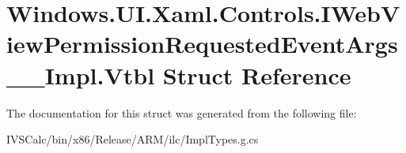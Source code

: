 \hypertarget{struct_windows_1_1_u_i_1_1_xaml_1_1_controls_1_1_i_web_view_permission_requested_event_args_____impl_1_1_vtbl}{}\section{Windows.\+U\+I.\+Xaml.\+Controls.\+I\+Web\+View\+Permission\+Requested\+Event\+Args\+\_\+\+\_\+\+Impl.\+Vtbl Struct Reference}
\label{struct_windows_1_1_u_i_1_1_xaml_1_1_controls_1_1_i_web_view_permission_requested_event_args_____impl_1_1_vtbl}


The documentation for this struct was generated from the following file\+:\begin{DoxyCompactItemize}
\item 
I\+V\+S\+Calc/bin/x86/\+Release/\+A\+R\+M/ilc/Impl\+Types.\+g.\+cs\end{DoxyCompactItemize}
